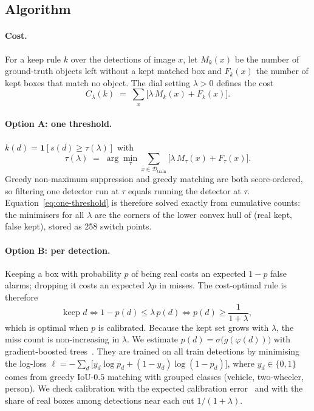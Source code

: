 \subsection{Algorithm}\label{sec:method-alg}

\paragraph{Cost.} For a keep rule $k$ over the detections of image $x$, let $M_k(x)$ be the number of
ground-truth objects left without a kept matched box and $F_k(x)$ the number of kept boxes that match no object.
The dial setting $\lambda > 0$ defines the cost
\begin{equation}
  C_\lambda(k) \;=\; \sum_{x}\big[\lambda\, M_k(x) + F_k(x)\big].
  \label{eq:cost}
\end{equation}

\paragraph{Option A: one threshold.} $k(d) = \mathbf{1}[s(d) \ge \tau(\lambda)]$ with
\begin{equation}
  \tau(\lambda) \;=\; \arg\min_{\tau} \sum_{x \in \mathcal{D}_{\text{train}}} \big[\lambda\, M_\tau(x) + F_\tau(x)\big].
  \label{eq:one-threshold}
\end{equation}
Greedy non-maximum suppression and greedy matching are both score-ordered, so filtering one detector run at
$\tau$ equals running the detector at $\tau$. Equation~\eqref{eq:one-threshold} is therefore solved exactly from
cumulative counts: the minimisers for all $\lambda$ are the corners of the lower convex hull of
(real kept, false kept), stored as 258 switch points.

\paragraph{Option B: per detection.} Keeping a box with probability $p$ of being real costs an expected
$1-p$ false alarms; dropping it costs an expected $\lambda p$ in misses. The cost-optimal rule is
therefore~\citep{elkan2001foundations}
\begin{equation}
  \text{keep } d \iff 1 - p(d) \le \lambda\, p(d) \iff p(d) \ge \frac{1}{1+\lambda},
  \label{eq:bayes}
\end{equation}
which is optimal when $p$ is calibrated. Because the kept set grows with $\lambda$, the miss count is
non-increasing in $\lambda$. We estimate $p(d) = \sigma\big(g(\varphi(d))\big)$ with gradient-boosted
trees~\citep{friedman2001gbm,ke2017lightgbm,pedregosa2011sklearn}. They are trained on all train detections by
minimising the log-loss
$\ell = -\sum_d \big[y_d \log p_d + (1-y_d)\log(1-p_d)\big]$, where $y_d \in \{0,1\}$ comes from greedy
IoU-$0.5$ matching with grouped classes (vehicle, two-wheeler, person). We check calibration with the expected
calibration error~\citep{guo2017calibration} and with the share of real boxes among detections near each cut
$1/(1+\lambda)$.


